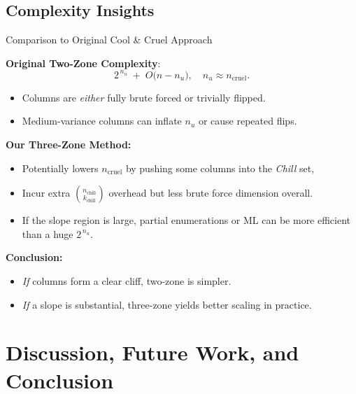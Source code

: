 \documentclass{beamer}
\begin{document}
\subsection*{Complexity Insights}
\begin{frame}{Comparison to Original Cool \& Cruel Approach}

\textbf{Original Two-Zone Complexity}:
\[
  2^{\,n_u} 
  \;+\; O\bigl(n - n_u\bigr),
  \quad
  n_u \approx n_{\mathrm{cruel}}.
\]
\begin{itemize}
  \item Columns are \emph{either} fully brute forced or trivially flipped.
  \item Medium-variance columns can inflate $n_u$ or cause repeated flips.
\end{itemize}

\vspace{0.3em}
\textbf{Our Three-Zone Method:}
\begin{itemize}
  \item Potentially lowers $n_{\mathrm{cruel}}$ by pushing some columns into the \emph{Chill} set,
  \item Incur extra $\binom{n_{\mathrm{chill}}}{k_{\mathrm{chill}}}$ overhead 
        but less brute force dimension overall.
  \item If the slope region is large, partial enumerations or ML can be more efficient than a huge $2^{\,n_u}$.
\end{itemize}

\textbf{Conclusion:}
\begin{itemize}
  \item \emph{If} columns form a clear cliff, two-zone is simpler.
  \item \emph{If} a slope is substantial, three-zone yields better scaling in practice.
\end{itemize}
\end{frame}



\section{Discussion, Future Work, and Conclusion}
\end{document}
